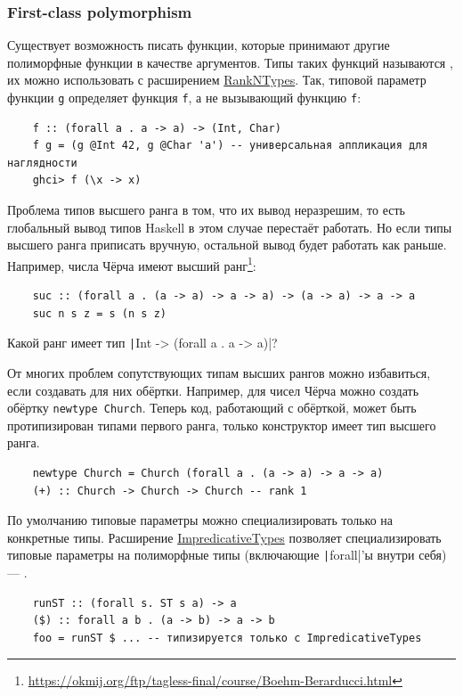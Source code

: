 \subsubsection{First-class polymorphism} \label{subsubsec:first-class-polymorphism}

Существует возможность писать функции, которые принимают другие полиморфные функции в качестве аргументов.
Типы таких функций называются , их можно использовать с расширением \href{https://downloads.haskell.org/ghc/latest/docs/users_guide/exts/rank_polymorphism.html}{RankNTypes}.
Так, типовой параметр функции \texttt{g} определяет функция \texttt{f}, а не вызывающий функцию \texttt{f}:
\begin{verbatim}
    f :: (forall a . a -> a) -> (Int, Char)
    f g = (g @Int 42, g @Char 'a') -- универсальная аппликация для наглядности
    ghci> f (\x -> x)
\end{verbatim}

Проблема типов высшего ранга в том, что их вывод неразрешим, то есть глобальный вывод типов Haskell в этом случае перестаёт работать.
Но если типы высшего ранга приписать вручную, остальной вывод будет работать как раньше.
Например, числа Чёрча имеют высший ранг\footnote{\url{https://okmij.org/ftp/tagless-final/course/Boehm-Berarducci.html}}:
\begin{verbatim}
    suc :: (forall a . (a -> a) -> a -> a) -> (a -> a) -> a -> a
    suc n s z = s (n s z)
\end{verbatim}

\begin{task}
    Какой ранг имеет тип \texttt|Int -> (forall a . a -> a)|?
\end{task}

От многих проблем сопутствующих типам высших рангов можно избавиться, если создавать для них обёртки.
Например, для чисел Чёрча можно создать обёртку \texttt{newtype Church}.
Теперь код, работающий с обёрткой, может быть протипизирован типами первого ранга, только конструктор имеет тип высшего ранга.
\begin{verbatim}
    newtype Church = Church (forall a . (a -> a) -> a -> a)
    (+) :: Church -> Church -> Church -- rank 1
\end{verbatim}

По умолчанию типовые параметры можно специализировать только на конкретные типы.
Расширение \href{https://downloads.haskell.org/ghc/latest/docs/users_guide/exts/impredicative_types.html}{ImpredicativeTypes} позволяет специализировать типовые параметры на полиморфные типы (включающие \texttt|forall|'ы внутри себя) --- .
\begin{verbatim}
    runST :: (forall s. ST s a) -> a
    ($) :: forall a b . (a -> b) -> a -> b
    foo = runST $ ... -- типизируется только с ImpredicativeTypes
\end{verbatim}

